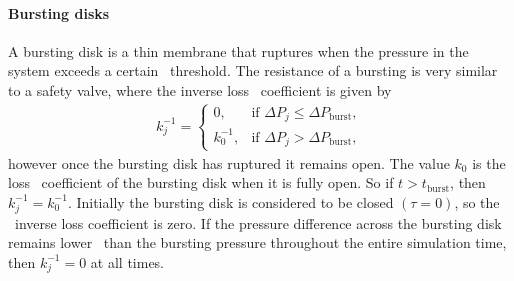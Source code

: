 \paragraph{Bursting disks} 

A bursting disk is a thin membrane that ruptures when the pressure in the system exceeds a certain \
threshold. The resistance of a bursting is very similar to a safety valve, where the inverse loss \ 
coefficient is given by 
\begin{align}
    \boxed{ 
        k_j^{-1} = 
        \begin{cases}
            0, & \text{if } \Delta P_j \leq \Delta P_{\text{burst}}, \\
            k_0^{-1}, & \text{if } \Delta P_j > \Delta P_{\text{burst}},
        \end{cases}
    }
\end{align}
however once the bursting disk has ruptured it remains open. The value $k_0$ is the loss \
coefficient of the bursting disk when it is fully open. So if $t > t_{\text{burst}}$, then \
$k_j^{-1} = k_0^{-1}$. Initially the bursting disk is considered to be closed $(\tau = 0)$, so the \ 
inverse loss coefficient is zero. If the pressure difference across the bursting disk remains lower \ 
than the bursting pressure throughout the entire simulation time, then $k_j^{-1} = 0$ at all times. 
